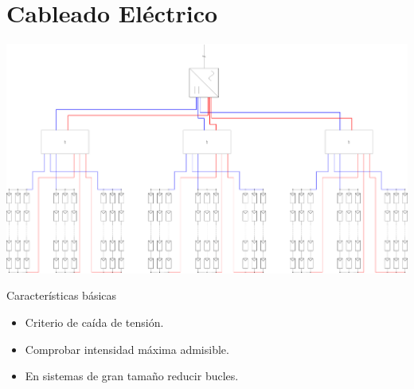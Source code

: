 \documentclass[aspectratio=169, usenames,svgnames,dvipsnames]{beamer}
\begin{document}
\section{Cableado Eléctrico}
\label{sec:org7a65dee}

\begin{frame}[label={sec:org9ac5d68},plain]{}
\begin{center}
\includegraphics[width=\textwidth]{../figs/CableadoCentral.pdf}
\end{center}
\end{frame}
\begin{frame}[label={sec:orga13754f}]{Características básicas}
\begin{itemize}
\item Criterio de caída de tensión.

\item Comprobar intensidad máxima admisible.

\item En sistemas de gran tamaño reducir bucles.
\end{itemize}
\end{frame}
\end{document}
